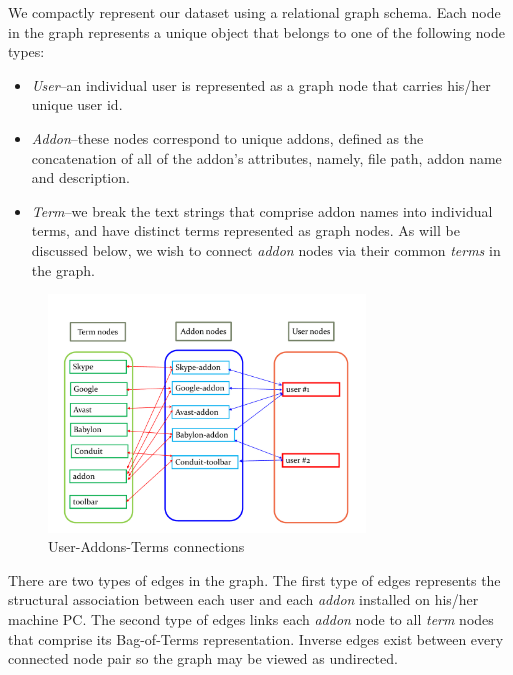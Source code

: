 \documentclass[ijoc,nonblindrev]{informs3} %
\numberwithin{equation}{subsection}
\begin{document}
We compactly represent our dataset using a relational graph schema. Each node in the graph represents a unique object that belongs to one of the following node types:
\begin{itemize}
\renewcommand{\labelitemi}{$\bullet$} 
\item {\it User}--an individual user is represented as a graph node that carries his/her unique user id. 
\item {\it Addon}--these nodes correspond to unique addons, defined as the concatenation of all of the addon's attributes, namely, file path, addon name and description.
\item {\it Term}--we break the text strings that comprise addon names into individual terms, and have distinct terms represented as graph nodes. As will be discussed below, we wish to connect {\it addon} nodes via their common {\it terms} in the graph.
\end{itemize}

\begin{figure}[!htbp]
\centering
\begin{small}
\includegraphics[width=0.75\textwidth]{figures/symbolic_graph.pdf}
\end{small}
\caption{User-Addons-Terms connections}
\label{fig:symbolic_graph}
\end{figure}

There are two types of edges in the graph. The first type of edges represents the structural association between each user and each {\it addon} installed on his/her machine PC. The second type of edges links each {\it addon} node to all {\it term} nodes that comprise its Bag-of-Terms representation. Inverse edges exist between every connected node pair so the graph may be viewed as undirected. 
\end{document}
